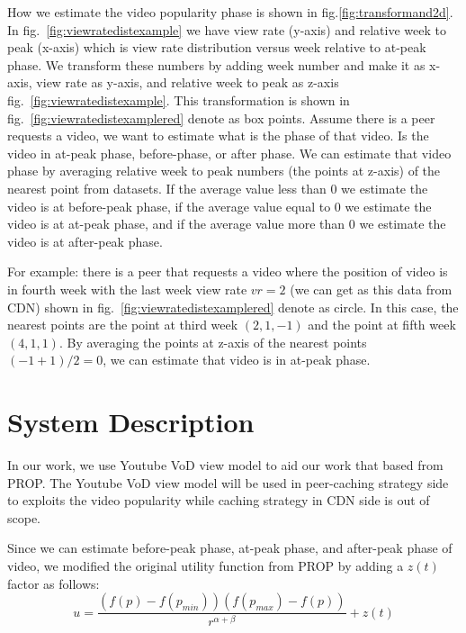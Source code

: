 \documentclass[10pt,final,journal,a4paper]{IEEEtran}
\begin{document}
How we estimate the video popularity phase is shown in fig.\ref{fig:transformand2d}.
In fig.~\ref{fig:viewratedistexample} we have view rate (y-axis) and relative week to peak (x-axis) which is view rate distribution versus week relative to at-peak phase.
We transform these numbers by adding week number and make it as x-axis, view rate 
as y-axis, and relative week to peak as z-axis fig.~\ref{fig:viewratedistexample}.
This transformation is shown in fig.~\ref{fig:viewratedistexamplered} denote as box points.
Assume there is a peer requests a video, we want to estimate what is the phase of that video. 
Is the video in at-peak phase, before-phase, or after phase.  
We can estimate that video phase by averaging relative week to peak numbers (the points at z-axis) of the nearest point from datasets. 
If the average value less than $0$ we estimate the video is at before-peak phase, if the average value equal to $0$ we estimate the video is at at-peak phase,  and if the average value more than $0$ we estimate the video is at after-peak phase.

For example: there is a peer that requests a video where the position of video is in fourth week with the last week view rate $vr=2$ (we can get as this data from CDN) shown in fig.~\ref{fig:viewratedistexamplered} denote as circle.
In this case, the nearest points are the point at third week $(2,1,-1)$ and the point at fifth week $(4,1,1)$.  
By averaging the points at z-axis of the nearest points $(-1 + 1)/2 = 0$,  we can estimate that video is in at-peak phase.


\section{System Description}\label{systemdescription}
In our work, we use Youtube VoD view model to aid our work that based from PROP. 
The Youtube VoD view model will be used in peer-caching strategy side to exploits the video popularity while caching strategy in CDN side is out of scope. 

Since we can estimate before-peak phase, at-peak phase, and after-peak phase of video, we modified the original utility function from PROP by adding a $z(t)$ factor as follows:
\begin{equation}
u = \frac{ (f(p) - f(p_{min})) (f(p_{max}) - f(p)) }{r^{\alpha + \beta}} + z(t)
\end{equation}
\end{document}
